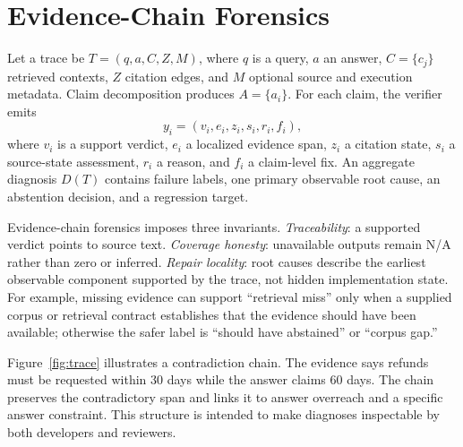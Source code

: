 \section{Evidence-Chain Forensics}
Let a trace be $T=(q,a,C,Z,M)$, where $q$ is a query, $a$ an answer,
$C=\{c_j\}$ retrieved contexts, $Z$ citation edges, and $M$ optional source and
execution metadata. Claim decomposition produces $A=\{a_i\}$. For each claim,
the verifier emits
\begin{equation}
 y_i=(v_i,e_i,z_i,s_i,r_i,f_i),
\end{equation}
where $v_i$ is a support verdict, $e_i$ a localized evidence span, $z_i$ a
citation state, $s_i$ a source-state assessment, $r_i$ a reason, and $f_i$ a
claim-level fix. An aggregate diagnosis $D(T)$ contains failure labels, one
primary observable root cause, an abstention decision, and a regression target.

Evidence-chain forensics imposes three invariants. \emph{Traceability}: a
supported verdict points to source text. \emph{Coverage honesty}: unavailable
outputs remain N/A rather than zero or inferred. \emph{Repair locality}: root
causes describe the earliest observable component supported by the trace, not
hidden implementation state. For example, missing evidence can support
``retrieval miss'' only when a supplied corpus or retrieval contract establishes
that the evidence should have been available; otherwise the safer label is
``should have abstained'' or ``corpus gap.''

Figure~\ref{fig:trace} illustrates a contradiction chain. The evidence says
refunds must be requested within 30 days while the answer claims 60 days. The
chain preserves the contradictory span and links it to answer overreach and a
specific answer constraint. This structure is intended to make diagnoses
inspectable by both developers and reviewers.



